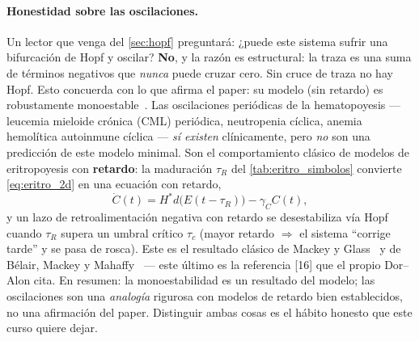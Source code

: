\paragraph{Honestidad sobre las oscilaciones.} Un lector que venga del \cref{sec:hopf} preguntará: ¿puede este sistema sufrir una bifurcación de Hopf y oscilar? \textbf{No}, y la razón es estructural: la traza es una suma de términos negativos que \emph{nunca} puede cruzar cero. Sin cruce de traza no hay Hopf. Esto concuerda con lo que afirma el paper: su modelo (sin retardo) es robustamente monoestable~\cite{dor2026}. Las oscilaciones periódicas de la hematopoyesis --- leucemia mieloide crónica (CML) periódica, neutropenia cíclica, anemia hemolítica autoinmune cíclica --- \emph{sí existen} clínicamente, pero \emph{no} son una predicción de este modelo minimal. Son el comportamiento clásico de modelos de eritropoyesis con \textbf{retardo}: la maduración $\tau_R$ del \cref{tab:eritro_simbolos} convierte \eqref{eq:eritro_2d} en una ecuación con retardo,
\begin{equation}
    \dot{C}(t) = H^* d\bigl(E(t-\tau_R)\bigr) - \gamma_C C(t),
    \label{eq:eritro_retardo}
\end{equation}
y un lazo de retroalimentación negativa con retardo se desestabiliza vía Hopf cuando $\tau_R$ supera un umbral crítico $\tau_c$ (mayor retardo $\Rightarrow$ el sistema ``corrige tarde'' y se pasa de rosca). Este es el resultado clásico de Mackey y Glass~\cite{mackeyglass1977} y de Bélair, Mackey y Mahaffy~\cite{belair1995} --- este último es la referencia [16] que el propio Dor--Alon cita. En resumen: la monoestabilidad es un resultado del modelo; las oscilaciones son una \emph{analogía} rigurosa con modelos de retardo bien establecidos, no una afirmación del paper. Distinguir ambas cosas es el hábito honesto que este curso quiere dejar.

